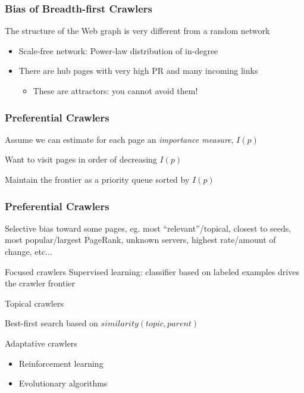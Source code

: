 \documentclass{beamer}
\begin{document}
\begin{frame} \frametitle{Bias of Breadth-first Crawlers}


\begin{block}{The structure of the Web graph is very different from a random network}

\begin{itemize}
\item Scale-free network: Power-law distribution of in-degree
\item There are hub pages with very high PR and many incoming links
\begin{itemize}
\item These are attractors: you cannot avoid them!
\end{itemize}
\end{itemize}

\end{block}

\end{frame}


\begin{frame} \frametitle{Preferential Crawlers}

Assume we can estimate for each page an {\em importance measure}, $I(p)$

Want to visit pages in order of decreasing $I(p)$

Maintain the frontier as a priority queue sorted by $I(p)$


\end{frame}


\begin{frame} \frametitle{Preferential Crawlers}

Selective bias toward some pages, eg. most ``relevant''/topical, closest to seeds, most popular/largest PageRank, unknown servers, highest rate/amount of change, etc...

\begin{block}{Focused crawlers}
Supervised learning: classifier based on labeled examples drives the
crawler frontier
\end{block}


\begin{block}{Topical crawlers}

Best-first search based on $similarity(topic, parent)$
\end{block}

\begin{block}{Adaptative crawlers}
\begin{itemize}
  \item Reinforcement learning
  \item Evolutionary algorithms
\end{itemize}
\end{block}

\end{frame}
\end{document}
